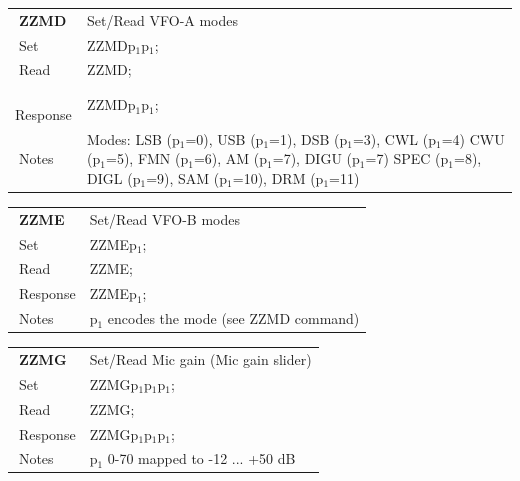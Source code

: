 \documentclass[12pt]{book}
\begin{document}
\begin{center}
\begin{tabular}{|p{2cm}|p{11cm}|}
\toprule
$\phantom{\Big|}$\textbf{\large ZZMD} & Set/Read VFO-A modes \\\cline{1-2}
$\phantom{\Big|}${\large Set} & {ZZMDp$_1$p$_1$;} \\\hline
$\phantom{\Big|}${\large Read} & {ZZMD;} \\\hline
$\phantom{\Big|}${\large Response} & {ZZMDp$_1$p$_1$;} \\\hline
$\phantom{\Big|}${\large Notes} & \multicolumn{1}{|p{11cm}|}{Modes: LSB (p$_1$=0), USB (p$_1$=1), DSB (p$_1$=3), CWL (p$_1$=4) CWU (p$_1$=5), FMN (p$_1$=6), AM (p$_1$=7), DIGU (p$_1$=7) SPEC (p$_1$=8), DIGL (p$_1$=9), SAM (p$_1$=10), DRM (p$_1$=11)} \\
\bottomrule
\end{tabular}
\end{center}

\begin{center}
\begin{tabular}{|p{2cm}|p{11cm}|}
\toprule
$\phantom{\Big|}$\textbf{\large ZZME} & Set/Read VFO-B modes \\\cline{1-2}
$\phantom{\Big|}${\large Set} & {ZZMEp$_1$;} \\\hline
$\phantom{\Big|}${\large Read} & {ZZME;} \\\hline
$\phantom{\Big|}${\large Response} & {ZZMEp$_1$;} \\\hline
$\phantom{\Big|}${\large Notes} & \multicolumn{1}{|p{11cm}|}{p$_1$ encodes the mode (see ZZMD command)} \\
\bottomrule
\end{tabular}
\end{center}

\begin{center}
\begin{tabular}{|p{2cm}|p{11cm}|}
\toprule
$\phantom{\Big|}$\textbf{\large ZZMG} & Set/Read Mic gain (Mic gain slider) \\\cline{1-2}
$\phantom{\Big|}${\large Set} & {ZZMGp$_1$p$_1$p$_1$;} \\\hline
$\phantom{\Big|}${\large Read} & {ZZMG;} \\\hline
$\phantom{\Big|}${\large Response} & {ZZMGp$_1$p$_1$p$_1$;} \\\hline
$\phantom{\Big|}${\large Notes} & \multicolumn{1}{|p{11cm}|}{p$_1$ 0-70 mapped to -12 ... +50 dB} \\
\bottomrule
\end{tabular}
\end{center}
\end{document}
